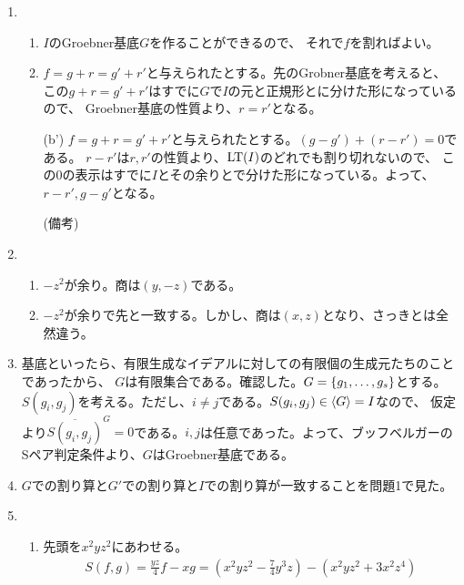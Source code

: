 \documentclass[9pt]{ltjsarticle}
\begin{document}
\begin{enumerate}[label=(問題 \arabic*)]
  \item
  \begin{enumerate}[label=(\alph*)]
    \item $I$のGroebner基底$G$を作ることができるので、
    それで$f$を割ればよい。
    \item $f=g+r=g'+r'$と与えられたとする。先のGrobner基底を考えると、
    この$g+r=g'+r'$はすでに$G$で$I$の元と正規形とに分けた形になっているので、
    Groebner基底の性質より、$r=r'$となる。
    \item[(b')] $f=g+r=g'+r'$と与えられたとする。$(g-g')+(r-r') = 0$である。
    $r-r'$は$r,r'$の性質より、${\rm LT}(I)$のどれでも割り切れないので、
    この$0$の表示はすでに$I$とその余りとで分けた形になっている。よって、
    $r-r',g-g'$となる。
    \item[(備考)] 
  \end{enumerate}
  \item
  \begin{enumerate}[label=(\alph*)]
    \item
    $-z^2$が余り。商は$(y,-z)$である。
    \item
    $-z^2$が余りで先と一致する。しかし、商は$(x,z)$となり、さっきとは全然違う。
  \end{enumerate}
  \item
  基底といったら、有限生成なイデアルに対しての有限個の生成元たちのことであったから、
  $G$は有限集合である。確認した。$G=\left\{g_1,\dots,g_s\right\}$とする。
  $S(g_i,g_j)$を考える。ただし、$i\neq j$である。$S(g_i,g_j)\in \left\langle G \right\rangle = I$なので、
  仮定より$\overline{S(g_i,g_j)}^G = 0$である。$i,j$は任意であった。よって、ブッフベルガーのSペア判定条件より、$G$はGroebner基底である。
  \item
  $G$での割り算と$G'$での割り算と$I$での割り算が一致することを問題1で見た。
  \item
  \begin{enumerate}[label=(\alph*)]
    \item 先頭を$x^2yz^2$にあわせる。
    \begin{align}
      S(f,g)
      =
      \frac{yz}{4}f - xg
      =
      (x^2yz^2 - \frac{7}{4}y^3z) - (x^2yz^2 + 3x^2z^4)

\end{align}
\end{enumerate}
\end{enumerate}
\end{document}
